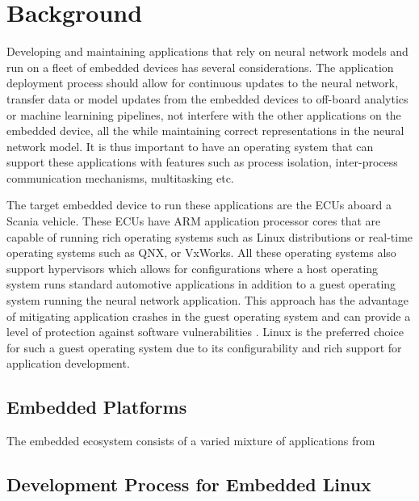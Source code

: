 
\chapter{Background}

Developing and maintaining applications that rely on neural network models and run on a fleet of embedded devices has several considerations. The application deployment process should allow for continuous updates to the neural network, transfer data or model updates from the embedded devices to off-board analytics or machine learnining pipelines, not interfere with the other applications on the embedded device, all the while maintaining correct representations in the neural network model. It is thus important to have an operating system that can support these applications with features such as process isolation, inter-process communication mechanisms, multitasking etc.

The target embedded device to run these applications are the ECUs aboard a Scania vehicle. These ECUs have ARM application processor cores that are capable of running rich operating systems such as Linux distributions or real-time operating systems such as QNX, or VxWorks. All these operating systems also support hypervisors which allows for configurations where a host operating system runs standard automotive applications in addition to a guest operating system running the neural network application. This approach has the advantage of mitigating application crashes in the guest operating system and can provide a level of protection against software vulnerabilities \cite{Linux-guest-os}. Linux is the preferred choice for such a guest operating system due to its configurability and rich support for application development.

\section{Embedded Platforms}

The embedded ecosystem consists of a varied mixture of applications from

\section{Development Process for Embedded Linux}

